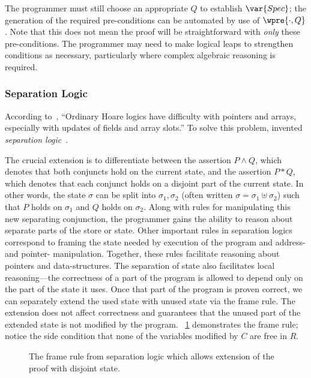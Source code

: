 The programmer must still choose an appropriate \(Q\) to establish
\(\var{Spec}\); the generation of the required pre-conditions can be automated
by use of \(\wpre{\cdot,Q}\). Note that this does not mean the proof will be
straightforward with \emph{only} these pre-conditions. The programmer may need
to make logical leaps to strengthen conditions as necessary, particularly where
complex algebraic reasoning is required.

\subsubsection{Separation Logic}

According to~\cite[\S 5]{Appel_2011}, ``Ordinary Hoare logics have difficulty
with pointers and arrays, especially with updates of fields and array slots.''
To solve this problem, \citeauthor{Reynolds} invented \emph{separation
logic}~\cite{Reynolds}.

The crucial extension is to differentiate between the assertion \(P \land Q\),
which denotes that both conjuncts hold on the current state, and the assertion
\(P * Q\), which denotes that each conjunct holds on a disjoint part of the
current state. In other words, the state \(\sigma\) can be split into
\(\sigma_1, \sigma_2\) (often written \(\sigma = \sigma_1 \uplus \sigma_2\))
such that \(P\) holds on \(\sigma_1\) and \(Q\) holds on \(\sigma_2\). Along
with rules for manipulating this new separating conjunction, the programmer
gains the ability to reason about separate parts of the store or state. Other
important rules in separation logics correspond to framing the state needed by
execution of the program and address- and pointer- manipulation. Together, these
rules facilitate reasoning about pointers and data-structures. The separation of
state also facilitates local reasoning---the correctness of a part of the
program is allowed to depend only on the part of the state it uses. Once that
part of the program is proven correct, we can separately extend the used state
with unused state via the frame rule. The extension does not affect correctness
and guarantees that the unused part of the extended state is not modified by the
program. \figurename~\ref{F:frame} demonstrates the frame rule; notice the side
condition that none of the variables modified by \(C\) are free in \(R\).

\begin{figure}[ht]
    \centering
    \caption{The frame rule from separation logic which allows extension of the
    proof with disjoint state.}\label{F:frame}
\end{figure}

